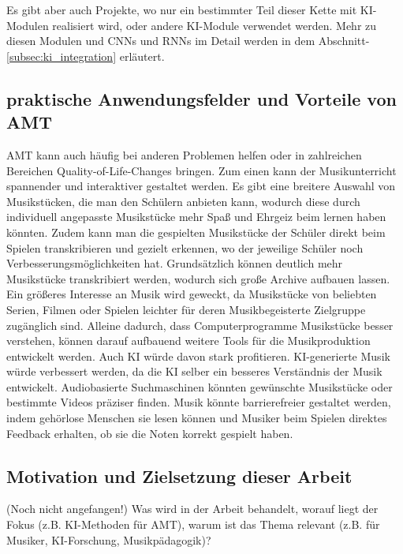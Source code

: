 Es gibt aber auch Projekte, wo nur ein bestimmter Teil dieser Kette mit KI-Modulen realisiert wird,
oder andere KI-Module verwendet werden.
Mehr zu diesen Modulen und CNNs und RNNs im Detail werden in dem Abschnitt-\ref{subsec:ki_integration} erläutert.

\subsection{praktische Anwendungsfelder und Vorteile von AMT}
AMT kann auch häufig bei anderen Problemen helfen
oder in zahlreichen Bereichen Quality-of-Life-Changes bringen.
Zum einen kann der Musikunterricht spannender und interaktiver gestaltet werden.
Es gibt eine breitere Auswahl von Musikstücken, die man den Schülern anbieten kann,
wodurch diese durch individuell angepasste Musikstücke mehr Spaß und Ehrgeiz beim lernen haben könnten.
Zudem kann man die gespielten Musikstücke der Schüler direkt beim Spielen transkribieren und gezielt erkennen,
wo der jeweilige Schüler noch Verbesserungsmöglichkeiten hat.
Grundsätzlich können deutlich mehr Musikstücke transkribiert werden,
wodurch sich große Archive aufbauen lassen.
Ein größeres Interesse an Musik wird geweckt, da Musikstücke von beliebten Serien, Filmen oder Spielen
leichter für deren Musikbegeisterte Zielgruppe zugänglich sind.
Alleine dadurch, dass Computerprogramme Musikstücke besser verstehen,
können darauf aufbauend weitere Tools für die Musikproduktion entwickelt werden.
Auch KI würde davon stark profitieren.
KI-generierte Musik würde verbessert werden, da die KI selber ein besseres Verständnis der Musik entwickelt.
Audiobasierte Suchmaschinen könnten gewünschte Musikstücke oder bestimmte Videos präziser finden.
Musik könnte barrierefreier gestaltet werden,
indem gehörlose Menschen sie lesen können und Musiker beim Spielen direktes Feedback erhalten,
ob sie die Noten korrekt gespielt haben.


\subsection{Motivation und Zielsetzung dieser Arbeit} (Noch nicht angefangen!)
Was wird in der Arbeit behandelt, worauf liegt der Fokus (z.B. KI-Methoden für AMT), warum ist das Thema relevant (z.B. für Musiker, KI-Forschung, Musikpädagogik)?

